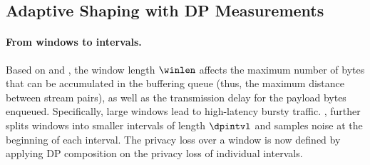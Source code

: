 
\subsection{Adaptive Shaping with DP Measurements}
\label{subsec:dp-queue-measurements}

\paragraph{From windows to intervals.}
{Based on  and ,}
the window length $\winlen$ affects the maximum number of bytes that can be
accumulated in the buffering queue (thus, the maximum distance between stream
pairs), as well as the transmission delay for the payload bytes enqueued.
Specifically, large windows lead to high-latency bursty traffic.
, {\sys} further splits windows into
smaller intervals of length $\dpintvl$ and samples noise at the beginning of
each interval.
The privacy loss over a window is now defined by applying DP composition
on the privacy loss of individual intervals.

